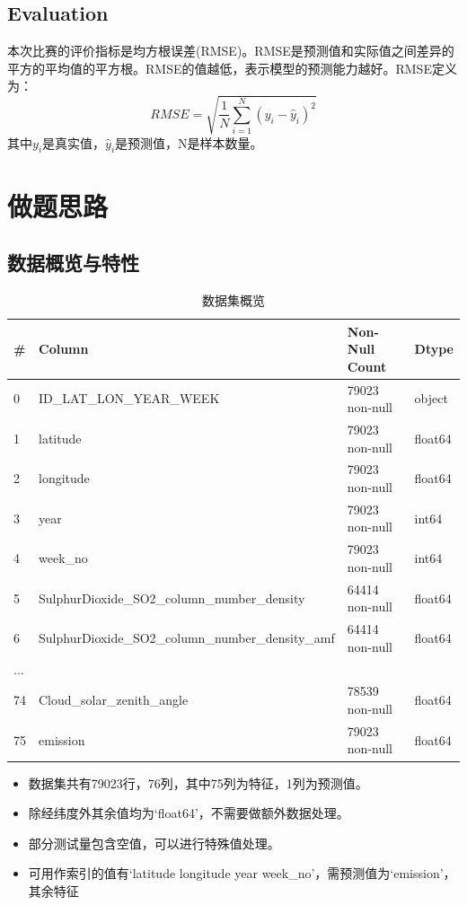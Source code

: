 \documentclass[fontset=windows]{article}
\begin{document}
\subsection{Evaluation}

本次比赛的评价指标是均方根误差(RMSE)。RMSE是预测值和实际值之间差异的平方的平均值的平方根。RMSE的值越低，表示模型的预测能力越好。RMSE定义为：$$RMSE=\sqrt{\frac{1}{N}\sum\limits_{i=1}^{N}(y_i-\hat y_i)^2}$$其中$y_i$是真实值，$\hat y_i$是预测值，N是样本数量。

\section{做题思路}

\subsection{数据概览与特性}

\begin{table}[h]
      \centering
      \begin{tabular}{|l|l|l|l|}
      \hline
          \# & Column & Non-Null Count & Dtype \\ \hline
          0 & ID\_LAT\_LON\_YEAR\_WEEK & 79023 non-null & object \\ \hline
          1 & latitude & 79023 non-null & float64 \\ \hline
          2 & longitude & 79023 non-null & float64 \\ \hline
          3 & year & 79023 non-null & int64 \\ \hline
          4 & week\_no & 79023 non-null & int64 \\ \hline
          5 & SulphurDioxide\_SO2\_column\_number\_density & 64414 non-null & float64 \\ \hline
          6 & SulphurDioxide\_SO2\_column\_number\_density\_amf & 64414 non-null & float64 \\ \hline
          ... & ~ & ~ & ~ \\ \hline
          74 & Cloud\_solar\_zenith\_angle & 78539 non-null & float64 \\ \hline
          75 & emission & 79023 non-null & float64 \\ \hline
      \end{tabular}
      \caption{数据集概览}
\end{table}

\begin{itemize}
      \item 数据集共有79023行，76列，其中75列为特征，1列为预测值。
      \item 除经纬度外其余值均为`float64'，不需要做额外数据处理。
      \item 部分测试量包含空值，可以进行特殊值处理。
      \item 可用作索引的值有`latitude longitude year week\_no'，需预测值为`emission'，其余特征
\end{itemize}
\end{document}
